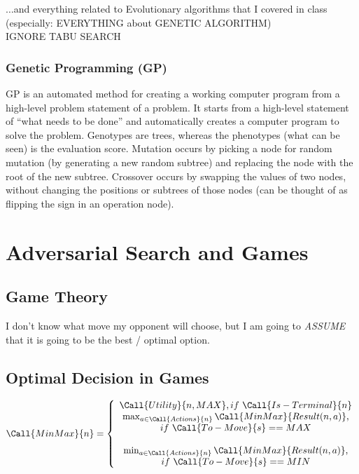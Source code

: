 \documentclass[exam={Midterm},color=true]{cs581exam}
\begin{document}
$\dots$and everything related to Evolutionary algorithms that I covered in class (especially: EVERYTHING about GENETIC ALGORITHM)\\
IGNORE TABU SEARCH

\subsubsection{Genetic Programming (GP)}\label{subsubsec:genetic-programming}
GP is an automated method for creating a working computer program from a high-level problem statement of a problem.
It starts from a high-level statement of ``what needs to be done'' and automatically creates a computer program to solve the problem.
Genotypes are trees, whereas the phenotypes (what can be seen) is the evaluation score.
Mutation occurs by picking a node for random mutation (by generating a new random subtree) and replacing the node with the root of the new subtree.
Crossover occurs by swapping the values of two nodes, without changing the positions or subtrees of those nodes (can be thought of as flipping the sign in an operation node).

\section{Adversarial Search and Games}\label{sec:adversarial-search-and-games}
\subsection{Game Theory}\label{subsec:5.1}
I don't know what move my opponent will choose, but I am going to \emph{ASSUME} that it is going to be the best / optimal option.

\subsection{Optimal Decision in Games}\label{subsec:5.2}
\[ \Call{MinMax}{n} = \left\{ \begin{array}{c}
	\Call{Utility}{n, MAX},if\ \Call{Is-Terminal}{n}\\
	\max_{a\in\Call{Actions}{n}}\Call{MinMax}{Result(n,a)},\\if\ \Call{To-Move}{s} == MAX\\\\
	\min_{a\in\Call{Actions}{n}}\Call{MinMax}{Result(n,a)},\\if\ \Call{To-Move}{s} == MIN\\
\end{array} \right. \]
\end{document}
